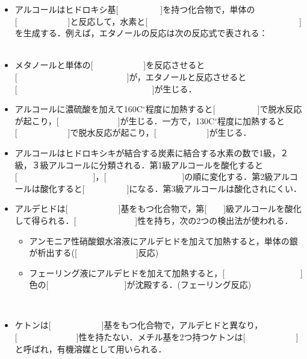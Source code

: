 \documentclass[a4paper,14pt]{ltjsarticle}
\title{}
\author{}
\date{}
\begin{document}
\pagestyle{empty}
\begin{itemize}
    \item アルコールはヒドロキシ基[　　　　　]を持つ化合物で，単体の[　　　　　　]と反応して，水素と[　　　　　　　　　　　　　　　　　　]を生成する．例えば，エタノールの反応は次の反応式で表される：\\
    \noindent [　　　　　　　　　　　　　　　　　　　　　　　　　　　　　　　　　　　　　]\\
    \item メタノールと単体の[　　　　　　]を反応させると[　　　　　　　　　　　　　]が，エタノールと反応させると[　　　　　　　　　　　　　　　　]が生じる．\\
    \item アルコールに濃硫酸を加えて160C$^\circ$程度に加熱すると[　　　　　]で脱水反応が起こり，[　　　　　　　]が生じる．一方で，130C$^\circ$程度に加熱すると[　　　　　　]で脱水反応が起こり，[　　　　　　]が生じる．\\
    \item アルコールはヒドロキシキが結合する炭素に結合する水素の数で1級，２級，３級アルコールに分類される．第1級アルコールを酸化すると[　　　　　　　　　]，[　　　　　　　　　]の順に変化する．第2級アルコールは酸化すると[　　　　　]になる．第3級アルコールは酸化されにくい．\\
    \item アルデヒドは[　　　　　　]基をもつ化合物で，第[　　]級アルコールを酸化して得られる．[　　　　　　　]性を持ち，次の2つの検出法が使われる．\begin{itemize}
        \item アンモニア性硝酸銀水溶液にアルデヒドを加えて加熱すると，単体の銀が析出する([　　　　　　　]反応)
              \item フェーリング液にアルデヒドを加えて加熱すると，[　　　　　　　　　]色の[　　　　　　　　　]が沈殿する．(フェーリング反応)
    \end{itemize}
    　\\
    \item ケトンは[　　　　　　]基をもつ化合物で，アルデヒドと異なり，[　　　　　　　]性を持たない．メチル基を2つ持つケトンは[　　　　　　]と呼ばれ，有機溶媒として用いられる．\\
  
\end{itemize}
\newpage
\end{document}
